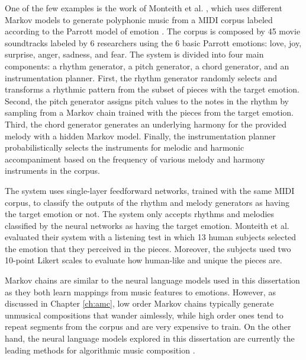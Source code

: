One of the few examples is the work of Monteith et al. \cite{monteith2010automatic, chan2008automatic}, which uses different Markov models to generate polyphonic music from a MIDI corpus labeled according to the Parrott model of emotion \cite{parrott2001emotions}. The corpus is composed by 45 movie soundtracks labeled by 6 researchers using the 6 basic Parrott emotions: love, joy, surprise, anger, sadness, and fear. The system is divided into four main components: a rhythm generator, a pitch generator, a chord generator, and an instrumentation planner.
First, the rhythm generator randomly selects and transforms a rhythmic pattern from the subset of pieces with the target emotion. Second, the pitch generator assigns pitch values to the notes in the rhythm by sampling from a Markov chain trained with the pieces from the target emotion. Third, the chord generator generates an underlying harmony for the provided melody with a hidden Markov model. Finally, the instrumentation planner probabilistically selects the instruments for melodic and harmonic accompaniment based on the frequency of various melody and harmony instruments in the corpus.

The system uses single-layer feedforward networks, trained with the same MIDI corpus, to classify the outputs of the rhythm and melody generators as having the target emotion or not. The system only accepts rhythms and melodies classified by the neural networks as having the target emotion. Monteith et al. \cite{monteith2010automatic} evaluated their system with a listening test in which 13 human subjects selected the emotion that they perceived in the pieces. Moreover, the subjects used two 10-point Likert scales to evaluate how human-like and unique the pieces are.

Markov chains are similar to the neural language models used in this dissertation as they both learn mappings from music features to emotions. However, as discussed in Chapter \ref{ch:amc}, low order Markov chains typically generate unmusical compositions that wander aimlessly, while high order ones tend to repeat segments from the corpus and are very expensive to train. On the other hand, the neural language models explored in this dissertation are currently the leading methods for algorithmic music composition \cite{yang2019deep}.


